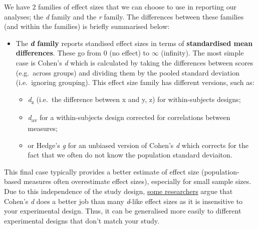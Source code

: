 \documentclass[
]{book}
\providecommand{\tightlist}{%
  \setlength{\itemsep}{0pt}\setlength{\parskip}{0pt}}
\begin{document}
We have 2 families of effect sizes that we can choose to use in reporting our analyses; the \emph{d} family and the \emph{r} family. The differences between these families (and within the families) is briefly summarised below:

\begin{itemize}
\tightlist
\item
  The \textbf{\emph{d} family} reports standised effect sizes in terms of \textbf{standardised mean differences}. These go from 0 (no effect) to \(\infty\) (infinity). The most simple case is Cohen's \emph{d} which is calculated by taking the differences between scores (e.g.~across groups) and dividing them by the pooled standard deviation (i.e.~ignoring grouping). This effect size family has different versions, such as:

  \begin{itemize}
  \tightlist
  \item
    \emph{d}\textsubscript{z} (i.e.~the difference between x and y, z) for within-subjects designs;
  \item
    \emph{d}\textsubscript{av} for a within-subjects design corrected for correlations between measures;
  \item
    or Hedge's \emph{g} for an unbiased version of Cohen's \emph{d} which corrects for the fact that we often do not know the population standard deviaiton.
  \end{itemize}
\end{itemize}

This final case typically provides a better estimate of effect size (population-based measures often overestimate effect sizes), especially for small sample sizes. Due to this independence of the study design, \href{http://jakewestfall.org/blog/index.php/2016/03/25/five-different-cohens-d-statistics-for-within-subject-designs/}{some researchers} argue that Cohen's \emph{d} does a better job than many \emph{d}-like effect sizes as it is insensitive to your experimental design. Thus, it can be generalised more easily to different experimental designs that don't match your study.
\end{document}
